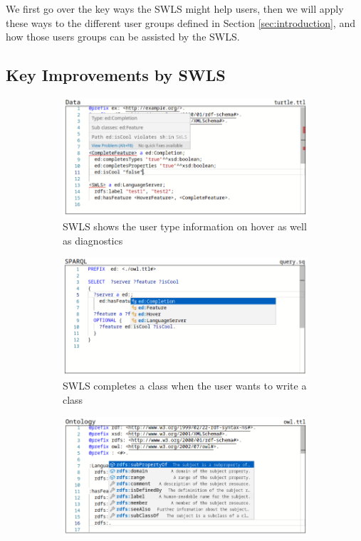 We first go over the key ways the SWLS might help users, then we will apply these ways to the different user groups defined in Section \ref{sec:introduction}, and how those users groups can be assisted by the SWLS.

\subsection{Key Improvements by SWLS}

\begin{figure}[tb]
    \centering
    \begin{subfigure}{0.48\textwidth}
      \includegraphics[width=\textwidth]{./images/hover.png}
      \caption{SWLS shows the user type information on hover as well as diagnostics}
      \label{hover}
    \end{subfigure}
    \hfill
    \begin{subfigure}{0.48\textwidth}
      \includegraphics[width=\textwidth]{./images/class.png}
      \caption{SWLS completes a class when the user wants to write a class}
      \label{class_completion}
    \end{subfigure}
    \hfill
    \begin{subfigure}{0.48\textwidth}
      \includegraphics[width=\textwidth]{./images/property.png}

\end{subfigure}
\end{figure}
